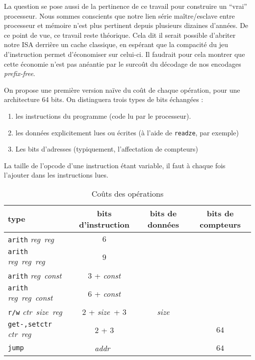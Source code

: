 \documentclass[architecture]{compas2018}
\newcommand{\reg}{\textit{reg}}
\newcommand{\const}{\textit{const}}
\newcommand{\ctr}{\textit{ctr}}
\newcommand{\size}{\textit{size}}
\newcommand{\addr}{\textit{addr}}
\begin{document}
La question se pose aussi de la pertinence de ce travail pour construire un ``vrai'' processeur.
Nous sommes conscients que notre  lien série maître/esclave entre processeur et mémoire n'est plus pertinent depuis plusieurs dizaines d'années.
De ce point de vue, ce travail reste théorique.
Cela dit il serait possible d'abriter notre ISA derrière un cache classique, en espérant que la compacité du jeu d'instruction permet d'économiser sur celui-ci.
Il faudrait pour cela montrer que cette économie n'est pas anéantie par le surcoût du décodage de nos encodages \emph{prefix-free}. 





\begin{table}[!h]
  \caption{Coûts des opérations}
  \label{tab:costs}
  On propose une première version naïve du coût de chaque opération, pour une architecture 64 bits.
  On distinguera trois types de bits échangées :
  \begin{enumerate}
  \item les instructions du programme (code lu par le processeur).
  \item les données explicitement lues ou écrites (à l'aide de \texttt{readze}, par exemple)
  \item Les bits d'adresses (typiquement, l'affectation de compteurs)
  \end{enumerate}
La taille de l'opcode d'une instruction étant variable, il faut à chaque fois l'ajouter dans les instructions lues.
  \begin{center}
  \begin{tabular}{|l|c|c|c|}
    \hline  
    type & bits d'instruction & bits de données & bits de compteurs \\
    \hline  
    \hline
    \texttt{arith} \reg\ \reg\ & $6$                &    &      \\
    \hline
    \texttt{arith} \reg\ \reg\ \reg\   & $9$   &    &      \\
    \hline
    \texttt{arith} \reg\ \const\       & $3$ + \const       &    &      \\
    \hline
    \texttt{arith} \reg\ \reg\ \const\ & $6$ + \const       &    &      \\
    \hline
    \texttt{r/w} \ctr\ \size\ \reg     & $2$ + \size\ + $3$ & \size           &      \\
    \hline
    \texttt{get-,setctr} \ctr\ \reg\   & $2$ + $3$          &    & $64$              \\
    \hline
    \texttt{jump}         & \addr\             &    & $64$              \\

\end{tabular}
\end{center}
\end{table}
\end{document}
